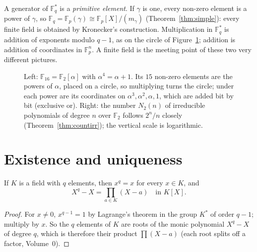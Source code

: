 A generator of $\mathbb F_q^*$ is a \emph{primitive element}. If $\gamma$ is one, every non-zero element is a power of $\gamma$, so $\mathbb F_q=\mathbb F_p(\gamma)\cong\mathbb F_p[X]/(m_\gamma)$ (Theorem~\ref{thm:simple}): every finite field is obtained by Kronecker's construction. Multiplication in $\mathbb F_q^*$ is addition of exponents modulo $q-1$, as on the circle of Figure~\ref{fig:f16}; addition is addition of coordinates in $\mathbb F_p^n$. A finite field is the meeting point of these two very different pictures.

\begin{figure}[ht]
\centering
{}
\caption{Left: $\mathbb F_{16}=\mathbb F_2[\alpha]$ with $\alpha^4=\alpha+1$. Its $15$ non-zero elements are the powers of $\alpha$, placed on a circle, so multiplying turns the circle; under each power are its coordinates on $\alpha^3,\alpha^2,\alpha,1$, which are added bit by bit (exclusive or). Right: the number $N_2(n)$ of irreducible polynomials of degree $n$ over $\mathbb F_2$ follows $2^n/n$ closely (Theorem~\ref{thm:countirr}); the vertical scale is logarithmic.}
\label{fig:f16}
\end{figure}

\section{Existence and uniqueness}

\begin{lemma}\label{lem:xqx}
If $K$ is a field with $q$ elements, then $x^q=x$ for every $x\in K$, and
\[
X^q-X=\prod_{a\in K}(X-a)\quad\text{in }K[X].
\]
\end{lemma}
\begin{proof}
For $x\ne0$, $x^{q-1}=1$ by Lagrange's theorem in the group $K^*$ of order $q-1$; multiply by $x$. So the $q$ elements of $K$ are roots of the monic polynomial $X^q-X$ of degree $q$, which is therefore their product $\prod(X-a)$ (each root splits off a factor, Volume~0).
\end{proof}

